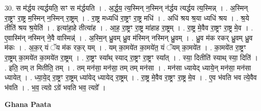 \documentclass[17pt]{extarticle}
\begin{document}
30. स म॑र्द्धय त्यर्द्धयति॒ सꣳ स म॑र्द्धयति । . अ॒र्द्ध॒य॒ त्य॒स्मिन् न॒स्मिन् न॑र्द्धय त्यर्द्धय त्य॒स्मिन्न् । . अ॒स्मिन् रा॒ष्ट्रꣳ रा॒ष्ट्र म॒स्मिन् न॒स्मिन् रा॒ष्ट्रम् । . रा॒ष्ट्र मध्यधि॑ रा॒ष्ट्रꣳ रा॒ष्ट्र मधि॑ । . अधि॑ श्रय श्र॒या ध्यधि॑ श्रय । . श्र॒ये तीति॑ श्रय श्र॒येति॑ । . इत्या॑हा॒हे तीत्या॑ह । . आ॒ह॒ रा॒ष्ट्रꣳ रा॒ष्ट्र मा॑हाह रा॒ष्ट्रम् । . रा॒ष्ट्र मे॒वैव रा॒ष्ट्रꣳ रा॒ष्ट्र मे॒व । . ए॒वास्मि॑न् नस्मिन् ने॒वै वास्मिन्न्॑ । . अ॒स्मि॒न् ध्रु॒वम् ध्रु॒व म॑स्मिन् नस्मिन् ध्रु॒वम् । . ध्रु॒व म॑क रकर् ध्रु॒वम् ध्रु॒व म॑कः । . अ॒क॒र् यं ॅय म॑क रक॒र् यम् । . यम् का॒मये॑त का॒मये॑त॒ यं ॅयम् का॒मये॑त । . का॒मये॑त रा॒ष्ट्रꣳ रा॒ष्ट्रम् का॒मये॑त का॒मये॑त रा॒ष्ट्रम् । . रा॒ष्ट्रꣳ स्या᳚थ् स्याद् रा॒ष्ट्रꣳ रा॒ष्ट्रꣳ स्या᳚त् । . स्या॒ दितीति॑ स्याथ् स्या॒ दिति॑ । . इति॒ तम् त मितीति॒ तम् । . तम् मन॑सा॒ मन॑सा॒ तम् तम् मन॑सा । . मन॑सा ध्यायेद् ध्याये॒न् मन॑सा॒ मन॑सा ध्यायेत् । . ध्या॒ये॒द् रा॒ष्ट्रꣳ रा॒ष्ट्रम् ध्या॑येद् ध्यायेद् रा॒ष्ट्रम् । . रा॒ष्ट्र मे॒वैव रा॒ष्ट्रꣳ रा॒ष्ट्र मे॒व । . ए॒व भ॑वति भव त्ये॒वैव भ॑वति । . भ॒व॒ त्यग्रे ऽग्रे॑ भवति भव॒ त्यग्रे᳚ । \newline

\textbf{Ghana Paata } \newline
\end{document}
